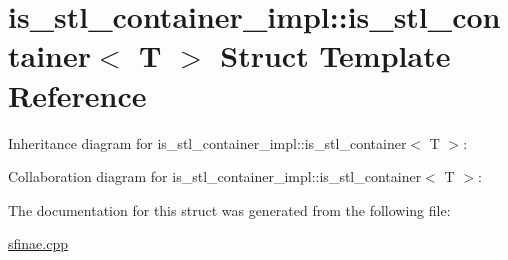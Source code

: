 \hypertarget{structis__stl__container__impl_1_1is__stl__container}{}\section{is\+\_\+stl\+\_\+container\+\_\+impl\+:\+:is\+\_\+stl\+\_\+container$<$ T $>$ Struct Template Reference}
\label{structis__stl__container__impl_1_1is__stl__container}


Inheritance diagram for is\+\_\+stl\+\_\+container\+\_\+impl\+:\+:is\+\_\+stl\+\_\+container$<$ T $>$\+:


Collaboration diagram for is\+\_\+stl\+\_\+container\+\_\+impl\+:\+:is\+\_\+stl\+\_\+container$<$ T $>$\+:


The documentation for this struct was generated from the following file\+:\begin{DoxyCompactItemize}
\item 
\hyperlink{sfinae_8cpp}{sfinae.\+cpp}\end{DoxyCompactItemize}
